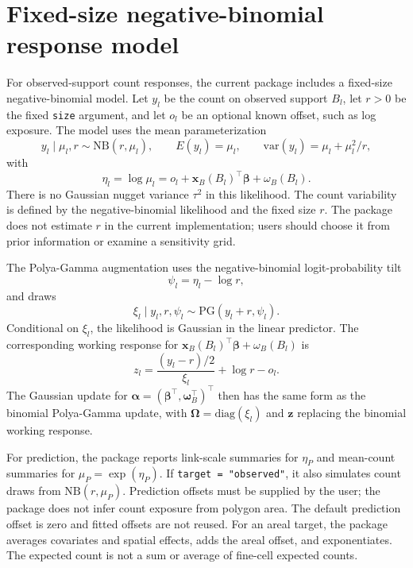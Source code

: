 \documentclass[11pt]{article}
\newcommand{\bbeta}{\bm{\beta}}
\newcommand{\bw}{\bm{\omega}}
\newcommand{\bz}{\bm{z}}
\newcommand{\bOmega}{\bm{\Omega}}
\newcommand{\trans}{^\top}
\begin{document}
\section{Fixed-size negative-binomial response model}

For observed-support count responses, the current package includes a
fixed-size negative-binomial model. Let \(y_l\) be the count on observed
support \(B_l\), let \(r>0\) be the fixed \texttt{size} argument, and let
\(o_l\) be an optional known offset, such as log exposure. The model uses the
mean parameterization
\begin{equation}
  y_l\mid \mu_l,r \sim \mathrm{NB}(r,\mu_l),
  \qquad
  E(y_l)=\mu_l,
  \qquad
  \mathrm{var}(y_l)=\mu_l+\mu_l^2/r,
\end{equation}
with
\begin{equation}
  \eta_l=\log\mu_l=o_l+\bm{x}_B(B_l)\trans\bbeta+\omega_B(B_l).
\end{equation}
There is no Gaussian nugget variance \(\tau^2\) in this likelihood. The
count variability is defined by the negative-binomial likelihood and the
fixed size \(r\). The package does not estimate \(r\) in the current
implementation; users should choose it from prior information or examine a
sensitivity grid.

The Polya-Gamma augmentation uses the negative-binomial logit-probability
tilt
\begin{equation}
  \psi_l = \eta_l-\log r,
\end{equation}
and draws
\begin{equation}
  \xi_l\mid y_l,r,\psi_l \sim \mathrm{PG}(y_l+r,\psi_l).
\end{equation}
Conditional on \(\xi_l\), the likelihood is Gaussian in the linear predictor.
The corresponding working response for
\(\bm{x}_B(B_l)\trans\bbeta+\omega_B(B_l)\) is
\begin{equation}
  z_l = \frac{(y_l-r)/2}{\xi_l}+\log r-o_l.
\end{equation}
The Gaussian update for \(\bm{\alpha}=(\bbeta\trans,\bw_B\trans)\trans\)
then has the same form as the binomial Polya-Gamma update, with
\(\bOmega=\mathrm{diag}(\xi_l)\) and \(\bz\) replacing the binomial working
response.

For prediction, the package reports link-scale summaries for \(\eta_P\) and
mean-count summaries for \(\mu_P=\exp(\eta_P)\). If
\texttt{target = "observed"}, it also simulates count draws from
\(\mathrm{NB}(r,\mu_P)\). Prediction offsets must be supplied by the user;
the package does not infer count exposure from polygon area.
The default prediction offset is zero and fitted offsets are not reused.
For an areal target, the package averages covariates and spatial effects,
adds the areal offset, and exponentiates. The expected count is not a sum or
average of fine-cell expected counts.
\end{document}
